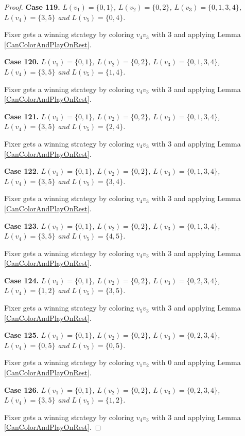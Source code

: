 \documentclass[12pt]{amsart}
\theoremstyle{plain}
\theoremstyle{definition}
\theoremstyle{remark}
\begin{document}
\begin{proof}
\noindent\textbf{Case 119.  }\textit{$L(v_1) = \{0, 1\}$, $L(v_2) = \{0, 2\}$, $L(v_3) = \{0, 1, 3, 4\}$, $L(v_4) = \{3, 5\}$ and $L(v_5) = \{0, 4\}$.}

Fixer gets a winning strategy by coloring $v_4v_3$ with $3$ and applying Lemma \ref{CanColorAndPlayOnRest}.

\noindent\textbf{Case 120.  }\textit{$L(v_1) = \{0, 1\}$, $L(v_2) = \{0, 2\}$, $L(v_3) = \{0, 1, 3, 4\}$, $L(v_4) = \{3, 5\}$ and $L(v_5) = \{1, 4\}$.}

Fixer gets a winning strategy by coloring $v_4v_3$ with $3$ and applying Lemma \ref{CanColorAndPlayOnRest}.

\noindent\textbf{Case 121.  }\textit{$L(v_1) = \{0, 1\}$, $L(v_2) = \{0, 2\}$, $L(v_3) = \{0, 1, 3, 4\}$, $L(v_4) = \{3, 5\}$ and $L(v_5) = \{2, 4\}$.}

Fixer gets a winning strategy by coloring $v_4v_3$ with $3$ and applying Lemma \ref{CanColorAndPlayOnRest}.

\noindent\textbf{Case 122.  }\textit{$L(v_1) = \{0, 1\}$, $L(v_2) = \{0, 2\}$, $L(v_3) = \{0, 1, 3, 4\}$, $L(v_4) = \{3, 5\}$ and $L(v_5) = \{3, 4\}$.}

Fixer gets a winning strategy by coloring $v_4v_3$ with $3$ and applying Lemma \ref{CanColorAndPlayOnRest}.

\noindent\textbf{Case 123.  }\textit{$L(v_1) = \{0, 1\}$, $L(v_2) = \{0, 2\}$, $L(v_3) = \{0, 1, 3, 4\}$, $L(v_4) = \{3, 5\}$ and $L(v_5) = \{4, 5\}$.}

Fixer gets a winning strategy by coloring $v_4v_3$ with $3$ and applying Lemma \ref{CanColorAndPlayOnRest}.

\noindent\textbf{Case 124.  }\textit{$L(v_1) = \{0, 1\}$, $L(v_2) = \{0, 2\}$, $L(v_3) = \{0, 2, 3, 4\}$, $L(v_4) = \{1, 2\}$ and $L(v_5) = \{3, 5\}$.}

Fixer gets a winning strategy by coloring $v_5v_3$ with $3$ and applying Lemma \ref{CanColorAndPlayOnRest}.

\noindent\textbf{Case 125.  }\textit{$L(v_1) = \{0, 1\}$, $L(v_2) = \{0, 2\}$, $L(v_3) = \{0, 2, 3, 4\}$, $L(v_4) = \{0, 5\}$ and $L(v_5) = \{0, 5\}$.}

Fixer gets a winning strategy by coloring $v_1v_2$ with $0$ and applying Lemma \ref{CanColorAndPlayOnRest}.

\noindent\textbf{Case 126.  }\textit{$L(v_1) = \{0, 1\}$, $L(v_2) = \{0, 2\}$, $L(v_3) = \{0, 2, 3, 4\}$, $L(v_4) = \{3, 5\}$ and $L(v_5) = \{1, 2\}$.}

Fixer gets a winning strategy by coloring $v_4v_3$ with $3$ and applying Lemma \ref{CanColorAndPlayOnRest}.


\end{proof}
\end{document}
